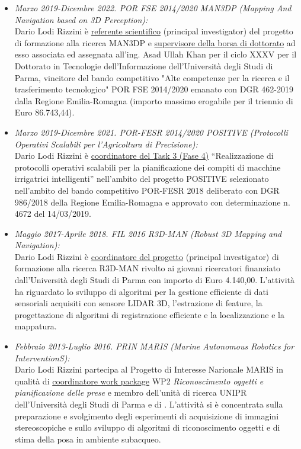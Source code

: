 \documentclass[11pt]{article}
\newcommand{\ITEMDATE}[1]{\item \textit{#1:}\\}
\begin{document}
\begin{itemize}

\ITEMDATE{Marzo 2019-Dicembre 2022. POR FSE 2014/2020 MAN3DP (Mapping And Navigation based on 3D Perception)}
Dario Lodi Rizzini \`e \ul{referente scientifico} (principal investigator) del progetto di formazione alla ricerca MAN3DP
e \ul{supervisore della borsa di dottorato} ad esso associata ed assegnata all'ing. Asad Ullah Khan per il ciclo
XXXV per il Dottorato in Tecnologie dell'Informazione dell'Universit\`a degli Studi di Parma,
vincitore del bando competitivo "Alte competenze per la ricerca e il trasferimento tecnologico"
POR FSE 2014/2020 emanato con DGR 462-2019 dalla Regione Emilia-Romagna (importo
massimo erogabile per il triennio di Euro 86.743,44). 

\ITEMDATE{Marzo 2019-Dicembre 2021. POR-FESR 2014/2020 POSITIVE (Protocolli Operativi Scalabili per l'Agricoltura di Precisione)}
Dario Lodi Rizzini \`e \ul{coordinatore del Task 3 (Fase 4)} ``Realizzazione di protocolli operativi scalabili per la
pianificazione dei compiti di macchine irrigatrici intelligenti'' nell'ambito del progetto POSITIVE
selezionato nell'ambito del bando competitivo POR-FESR 2018 deliberato con DGR 986/2018 della Regione Emilia-Romagna e
approvato con determinazione n. 4672 del 14/03/2019.

\ITEMDATE{Maggio 2017-Aprile 2018.  FIL 2016 R3D-MAN (Robust 3D Mapping and Navigation)}
Dario Lodi Rizzini \`e \ul{coordinatore del progetto} (principal investigator) di formazione alla ricerca R3D-MAN rivolto ai giovani 
ricercatori finanziato dall'Universit\`a degli Studi di Parma con importo di Euro 4.140,00. 
L'attivit\`a ha riguardato lo sviluppo di algoritmi per la gestione efficiente di dati sensoriali 
acquisiti con sensore LIDAR 3D, l'estrazione di feature, la progettazione di algoritmi di registrazione 
efficiente e la localizzazione e la mappatura. 

\ITEMDATE{Febbraio 2013-Luglio 2016. PRIN MARIS (Marine Autonomous Robotics for InterventionS)} 
Dario Lodi Rizzini partecipa al Progetto di Interesse Narionale MARIS in qualit\`a di 
\ul{coordinatore work package} WP2 \emph{Riconoscimento oggetti e pianificazione delle prese}
e membro dell'unit\`a di ricerca UNIPR dell'Universit\`a degli Studi di Parma e di . 
L'attivit\`a si \`e concentrata sulla preparazione e svolgimento degli esperimenti
di acquisizione di immagini stereoscopiche e sullo sviluppo di algoritmi di riconoscimento 
oggetti e di stima della posa in ambiente subacqueo.

\end{itemize}
\end{document}
